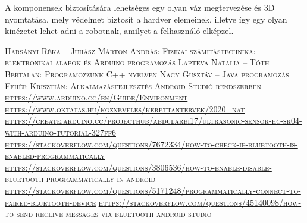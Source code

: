 \documentclass[]{thesis-ekf}
\theoremstyle{definition}
\begin{document}
A komponensek biztosítására lehetséges egy olyan váz megtervezése és 3D nyomtatása, mely védelmet biztosít a hardver elemeinek, illetve így egy olyan kinézetet lehet adni a robotnak, amilyet a felhasználó elképzel.
\begin{thebibliography}{1}
	 \textsc{Harsányi Réka -- Juhász Márton András: Fizikai számítástechnika: elektronikai alapok és Arduino programozás}
	 \textsc{Lapteva Natalia -- Tóth Bertalan: Programozzunk C++ nyelven}
	 \textsc{Nagy Gusztáv -- Java programozás}
		\textsc{Fehér Krisztián: Alkalmazásfejlesztés Android Stúdió rendszerben}
	 \textsc{\url{https://www.arduino.cc/en/Guide/Environment}}
	 \textsc{\url{https://www.oktatas.hu/kozneveles/kerettantervek/2020\_nat}}
	\textsc{\url{https://create.arduino.cc/projecthub/abdularbi17/ultrasonic-sensor-hc-sr04-with-arduino-tutorial-327ff6}}
	\textsc{\url{https://stackoverflow.com/questions/7672334/how-to-check-if-bluetooth-is-enabled-programmatically}}
	\textsc{\url{https://stackoverflow.com/questions/3806536/how-to-enable-disable-bluetooth-programmatically-in-android}}
	\textsc{\url{https://stackoverflow.com/questions/5171248/programmatically-connect-to-paired-bluetooth-device}}
	\textsc{\url{https://stackoverflow.com/questions/45140098/how-to-send-receive-messages-via-bluetooth-android-studio}}
\end{thebibliography}
\end{document}
